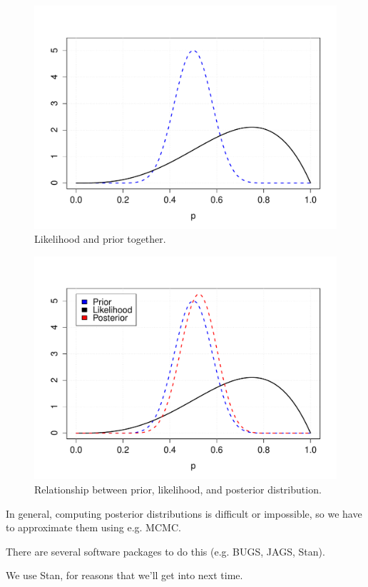 \documentclass{beamer}
\begin{document}
\begin{frame}
    \begin{figure}
    \centering
        \includegraphics[width=.8\textwidth]{../images/binom_prior_likelihood.pdf}
        \caption{Likelihood and prior together.}
    \end{figure}
\end{frame}

\begin{frame}
    \begin{figure}
    \centering
        \includegraphics[width=.8\textwidth]{../images/binom_posterior.pdf}
        \caption{Relationship between prior, likelihood, and posterior distribution.}
    \end{figure}
\end{frame}



\begin{frame}
In general, computing posterior distributions is difficult or impossible, so we have to approximate them using e.g. MCMC. \par

There are several software packages to do this (e.g. BUGS, JAGS, Stan). \par 

We use Stan, for reasons that we'll get into next time.
\end{frame}
\end{document}
